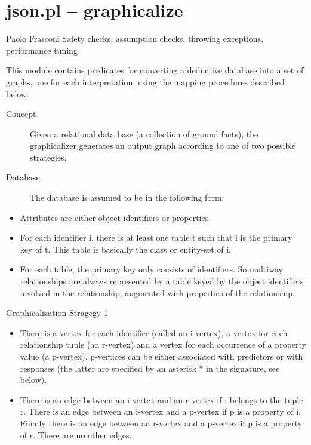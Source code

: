 \documentclass[11pt]{article}
\begin{document}



\section{json.pl -- graphicalize}

\label{sec:json}

\begin{tags}
Paolo Frasconi
Safety checks, assumption checks, throwing exceptions, performance tuning
\end{tags}

This module contains predicates for converting a deductive database
into a set of graphs, one for each interpretation, using the mapping
procedures described below.

\begin{description}
    \item[Concept] 
Given a relational data base (a collection of ground facts), the
graphicalizer generates an output graph according to one of two
possible strategies.
    \item[Database] 
The database is assumed to be in the following form:
\end{description}

\begin{itemize}
    \item Attributes are either object identifiers or properties.
    \item For each identifier i, there is at least one table t such that i
is the primary key of t. This table is basically the class or
entity-set of i.
    \item For each table, the primary key only consists of identifiers. So
multiway relationships are always represented by a table keyed by
the object identifiers involved in the relationship, augmented
with properties of the relationship.
\end{itemize}

\begin{description}
    \item[Graphicalization Stragegy 1] 
\end{description}

\begin{itemize}
    \item There is a vertex for each identifier (called an i-vertex), a
vertex for each relationship tuple (an r-vertex) and a vertex for
each occurrence of a property value (a p-vertex). p-vertices can be
either associated with predictors or with responses (the latter are
specified by an asterisk * in the signature, see below).
    \item There is an edge between an i-vertex and an r-vertex if i belongs
to the tuple r. There is an edge between an i-vertex and a p-vertex
if p is a property of i. Finally there is an edge between an
r-vertex and a p-vertex if p is a property of r. There are no other
edges.
\end{itemize}
\end{document}
